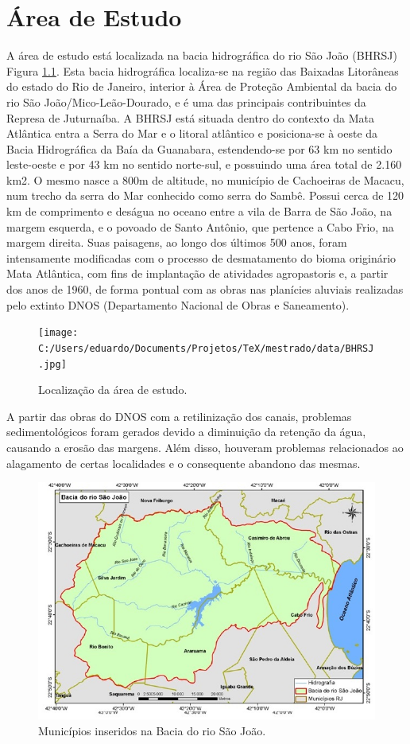 \chapter{Área de Estudo}
A área de estudo está localizada na bacia hidrográfica do rio São João (BHRSJ) Figura \ref{fig:locareaestudo}. Esta bacia hidrográfica localiza-se na região das Baixadas Litorâneas do estado do Rio de Janeiro, interior à Área de Proteção Ambiental da bacia do rio São João/Mico-Leão-Dourado, e é uma das principais contribuintes da Represa de Juturnaíba. A BHRSJ está situada dentro do contexto da Mata Atlântica entra a Serra do Mar e o litoral atlântico e posiciona-se à oeste da Bacia Hidrográfica da Baía da Guanabara, estendendo-se por 63 km no sentido leste-oeste e por 43 km no sentido norte-sul, e possuindo uma área total de 2.160 km2. O mesmo nasce a 800m de altitude, no município de Cachoeiras de Macacu, num trecho da serra do Mar conhecido como serra do Sambê. Possui cerca de 120 km de comprimento e deságua no oceano entre a vila de Barra de São João, na margem esquerda, e o povoado de Santo Antônio, que pertence a Cabo Frio, na margem direita. Suas paisagens, ao longo dos últimos 500 anos, foram intensamente modificadas com o processo de desmatamento do bioma originário Mata Atlântica, com fins de implantação de atividades agropastoris e, a partir dos anos de 1960, de forma pontual com as obras nas planícies aluviais realizadas pelo extinto DNOS (Departamento Nacional de Obras e Saneamento). \\

	\begin{figure}
		\centering
		\texttt{[image: C:/Users/eduardo/Documents/Projetos/TeX/mestrado/data/BHRSJ.jpg]}
		\caption{Localização da área de estudo.}
		\label{fig:locareaestudo}
	\end{figure}


A partir das obras do DNOS com a retilinização dos canais, problemas sedimentológicos foram gerados devido a diminuição da retenção da água, causando a erosão das margens. Além disso, houveram problemas relacionados ao alagamento de certas localidades e o consequente abandono das mesmas. \\

	\begin{figure}
		\centering
		\includegraphics[width=0.9\linewidth]{data/BHRSJ_2}
		\caption{Municípios inseridos na Bacia do rio São João.}
		\label{fig:bhrsj2}
	\end{figure}


